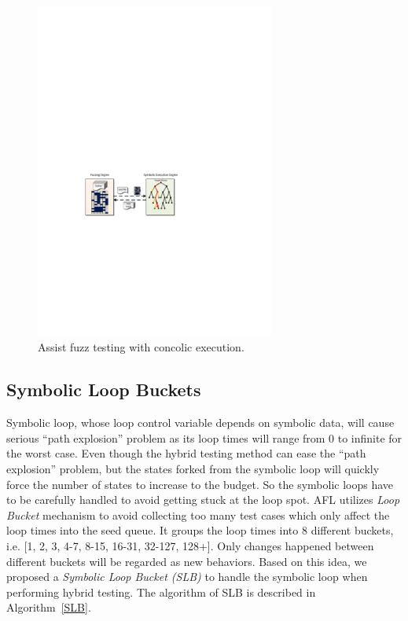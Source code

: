 \begin{figure}
\centering
\includegraphics[width=0.7\textwidth]{figures/s2e-assist.pdf} 
\caption{Assist fuzz testing with concolic execution.}\label{s2e-assist}
\end{figure}


\subsection{Symbolic Loop Buckets}
Symbolic loop, whose loop control variable depends on symbolic data, will cause serious ``path explosion'' problem as its loop times will range from 0 to infinite for the worst case. 
Even though the hybrid testing method can ease the ``path explosion'' problem, but the states forked from the symbolic loop will quickly force the number of states to increase to the budget. So the symbolic loops have to be carefully handled to avoid getting stuck at the loop spot. AFL utilizes \emph{Loop Bucket} mechanism to avoid collecting too many test cases which only affect the loop times into the seed queue. It groups the loop times into 8 different buckets, i.e. [1, 2, 3, 4-7, 8-15, 16-31, 32-127, 128+]. Only changes happened between different buckets will be regarded as new behaviors. Based on this idea, we proposed a \textit{Symbolic Loop Bucket (SLB)} to handle the symbolic loop when performing hybrid testing. The algorithm of SLB is described in Algorithm~\ref{SLB}.

